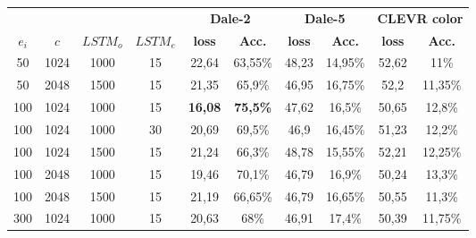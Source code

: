 \begin{table}[hb]
    \centering
    \begin{tabular}{cccc|cc|cc|cc}
        \toprule
              &        &          &          & \multicolumn{2}{c}{\textbf{Dale-2}} & \multicolumn{2}{c}{\textbf{Dale-5}} & \multicolumn{2}{c}{\textbf{CLEVR color}}                                                 \\  \cmidrule(lr){5-6}\cmidrule(lr){7-8}\cmidrule(lr){9-10}
        $e_i$ & $c$    & $LSTM_o$ & $LSTM_e$ & \textbf{loss}                       & \textbf{Acc.}                       & \textbf{loss}                            & \textbf{Acc.} & \textbf{loss} & \textbf{Acc.} \\\midrule
        {50}  & {1024} & {1000}   & {15}     & {22,64}                             & {63,55\%}                           & {48,23}                                  & {14,95\%}     & {52,62}       & {11\%}        \\
        {50}  & {2048} & {1500}   & {15}     & {21,35}                             & {65,9\%}                            & {46,95}                                  & {16,75\%}     & {52,2}        & {11,35\%}     \\
        {100} & {1024} & {1000}   & {15}     & \textbf{16,08}                      & \textbf{75,5\%}                     & {47,62}                                  & {16,5\%}      & {50,65}       & {12,8\%}      \\
        {100} & {1024} & {1000}   & {30}     & {20,69}                             & {69,5\%}                            & {46,9}                                   & {16,45\%}     & {51,23}       & {12,2\%}      \\
        {100} & {1024} & {1500}   & {15}     & {21,24}                             & {66,3\%}                            & {48,78}                                  & {15,55\%}     & {52,21}       & {12,25\%}     \\
        {100} & {2048} & {1000}   & {15}     & {19,46}                             & {70,1\%}                            & {46,79}                                  & {16,9\%}      & {50,24}       & {13,3\%}      \\
        {100} & {2048} & {1500}   & {15}     & {21,19}                             & {66,65\%}                           & {46,79}                                  & {16,65\%}     & {50,55}       & {11,3\%}      \\
        {300} & {1024} & {1000}   & {15}     & {20,63}                             & {68\%}                              & {46,91}                                  & {17,4\%}      & {50,39}       & {11,75\%}     \\

\end{tabular}
\end{table}
